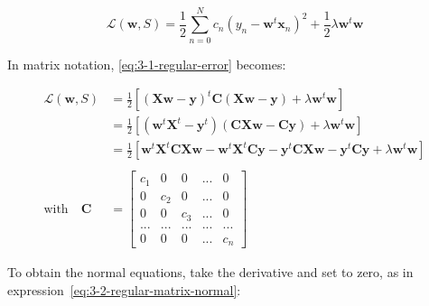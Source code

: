 \documentclass[paper=a4, fontsize=11pt]{scrartcl} %
\numberwithin{equation}{section} %
\numberwithin{figure}{section} %
\numberwithin{table}{section} %
\begin{document}
\subsection{}
\label{subsec:3-2}

\begin{equation}
    \mathcal{L}(\textbf{w},S) = \frac{1}{2}\sum_{n=0}^{N}c_n(y_n - \textbf{w}^{t}\textbf{x}_n)^{2} + \frac{1}{2}\lambda\textbf{w}^{t}\textbf{w}
    \label{eq:3-1-regular-error}
\end{equation}

In matrix notation, \ref{eq:3-1-regular-error} becomes:

\begin{equation}
\begin{split}
    \mathcal{L}(\textbf{w},S) &= \frac{1}{2}\left[\left(\textbf{X}\textbf{w} - \textbf{y}\right)^{t}\textbf{C}\left(\textbf{X}\textbf{w} - \textbf{y}\right) + \lambda\textbf{w}^{t}\textbf{w}\right]\\
    &= \frac{1}{2}\left[\left(\textbf{w}^{t}\textbf{X}^{t} - \textbf{y}^{t}\right)\left(\textbf{C}\textbf{X}\textbf{w} - \textbf{C}\textbf{y}\right) + \lambda\textbf{w}^{t}\textbf{w}\right]\\
    &= \frac{1}{2}\left[\textbf{w}^{t}\textbf{X}^{t}\textbf{C}\textbf{X}\textbf{w} - \textbf{w}^{t}\textbf{X}^{t}\textbf{C}\textbf{y} - 
\textbf{y}^{t}\textbf{C}\textbf{X}\textbf{w} - \textbf{y}^{t}\textbf{C}\textbf{y} + \lambda\textbf{w}^{t}\textbf{w}\right]\\
    \\
    \text{with} \quad \textbf{C} &= \begin{bmatrix} c_1 & 0 & 0 & ... & 0 \\ 0 & c_2 & 0 & ... & 0 \\ 0 & 0 & c_3 & ... & 0 \\ ... & ... & ... & ... & ... \\ 0 & 0 & 0 & ... & c_n \end{bmatrix}
    \label{eq:3-2-regular-matrix}
\end{split}
\end{equation}

To obtain the normal equations, take the derivative and set to zero, as in 
expression~\ref{eq:3-2-regular-matrix-normal}:
\end{document}
